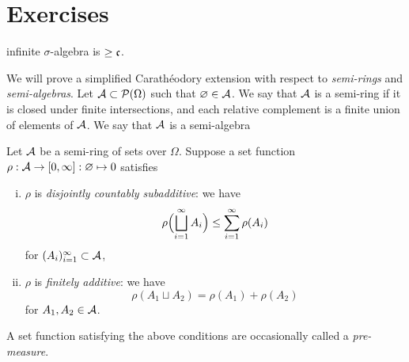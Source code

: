 \documentclass{../../large}
\begin{document}
\begin{prb}
\end{prb}

\begin{prb}
\end{prb}

\begin{prb}
\end{prb}




\section*{Exercises}
\begin{prb}

\end{prb}

\begin{prb}[Cardinalities]
infinite $\sigma$-algebra is $\ge\mathfrak{c}$.

\end{prb}

\begin{prb}
We will prove a simplified Carath\'eodory extension with respect to \emph{semi-rings} and \emph{semi-algebras}.
Let $\mathcal{A}\subset\mathcal{P}(\Omega)$ such that $\varnothing\in\mathcal{A}$.
We say that $\mathcal{A}$ is a semi-ring if it is closed under finite intersections, and each relative complement is a finite union of elements of $\mathcal{A}$.
We say that $\mathcal{A}$ is a semi-algebra

Let $\mathcal{A}$ be a semi-ring of sets over $\Omega$.
Suppose a set function $\rho:\mathcal{A}\to[0,\infty]:\varnothing\mapsto0$ satisfies
\begin{enumerate}[(i)]
\item $\rho$ is \emph{disjointly countably subadditive}: we have
\[\rho\Bigl(\bigsqcup_{i=1}^\infty A_i\Bigr)\le\sum_{i=1}^\infty\rho(A_i)\]
for $(A_i)_{i=1}^\infty\subset\mathcal{A}$,
\item $\rho$ is \emph{finitely additive}: we have
\[\rho(A_1\sqcup A_2)=\rho(A_1)+\rho(A_2)\]
for $A_1,A_2\in\mathcal{A}$.
\end{enumerate}
A set function satisfying the above conditions are occasionally called a \emph{pre-measure}.
\begin{parts}
\item
\item 
\end{parts}
\end{prb}
\end{document}
